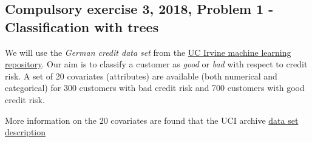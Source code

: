 \documentclass[]{article}
\newenvironment{Shaded}{\begin{snugshade}}{\end{snugshade}}
\newcommand{\CommentTok}[1]{\textcolor[rgb]{0.56,0.35,0.01}{\textit{#1}}}
\newcommand{\KeywordTok}[1]{\textcolor[rgb]{0.13,0.29,0.53}{\textbf{#1}}}
\newcommand{\NormalTok}[1]{#1}
\newcommand{\OperatorTok}[1]{\textcolor[rgb]{0.81,0.36,0.00}{\textbf{#1}}}
\newcommand{\StringTok}[1]{\textcolor[rgb]{0.31,0.60,0.02}{#1}}
\begin{document}
\hypertarget{compulsory-exercise-3-2018-problem-1---classification-with-trees}{%
\subsection{Compulsory exercise 3, 2018, Problem 1 - Classification with
trees}\label{compulsory-exercise-3-2018-problem-1---classification-with-trees}}

We will use the \emph{German credit data set} from the
\href{https://archive.ics.uci.edu/ml/index.php}{UC Irvine machine
learning repository}. Our aim is to classify a customer as \emph{good}
or \emph{bad} with respect to credit risk. A set of 20 covariates
(attributes) are available (both numerical and categorical) for 300
customers with bad credit risk and 700 customers with good credit risk.

More information on the 20 covariates are found that the UCI archive
\href{https://archive.ics.uci.edu/ml/datasets/Statlog+\%28German+Credit+Data\%29}{data
set description}

\begin{Shaded}
\end{Shaded}
\end{document}
